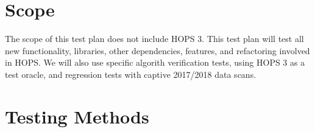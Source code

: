 \documentclass[notitlepage,letterpaper,pdftex,12pt,final]{article}
\numberwithin{equation}{section}
\begin{document}
\section{Scope}
\label{sec:scope}
The scope of this test plan does not include \ac{HOPS} 3. This test plan will test
all new functionality, libraries, other dependencies, features, and refactoring involved in
\ac{HOPS}. We will also use specific algorith verification tests, using \ac{HOPS} 3 as a test
oracle, and regression tests with captive 2017/2018 data scans.

\pagebreak
\section{Testing Methods}
\label{sec:testing-methods}



\pagebreak


\pagebreak


\pagebreak


\pagebreak


\pagebreak


\pagebreak


\addtocounter{section}{1}
\renewcommand{\refname}{\thesection. References}
\printbibliography
\label{sec:references}


\label{page:LastPage}
\end{document}
